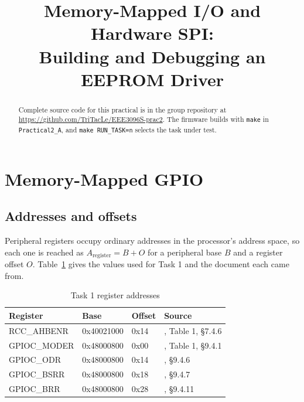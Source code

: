 \documentclass[conference]{IEEEtran}
\begin{document}
\title{Memory-Mapped I/O and Hardware SPI:\\Building and Debugging an EEPROM Driver}

\author{
\and
{}
}

\maketitle

\begin{abstract}
Complete source code for this practical is in the group repository at
\url{https://github.com/TriTacLe/EEE3096S-prac2}. The firmware builds with
\texttt{make} in \texttt{Practical2\_A}, and \texttt{make RUN\_TASK=n} selects
the task under test.
\end{abstract}

\section{Memory-Mapped GPIO}

\subsection{Addresses and offsets}

Peripheral registers occupy ordinary addresses in the processor's address
space, so each one is reached as $A_{\text{register}} = B + O$ for a peripheral
base $B$ and a register offset $O$. Table~\ref{tab:addresses} gives the values
used for Task 1 and the document each came from.

\begin{table}[htbp]
\caption{Task 1 register addresses}
\label{tab:addresses}
\centering
\begin{tabular}{llll}
\toprule
Register & Base & Offset & Source \\
\midrule
RCC\_AHBENR  & 0x40021000 & 0x14 & \cite{rm0091}, Table 1, \S7.4.6 \\
GPIOC\_MODER & 0x48000800 & 0x00 & \cite{rm0091}, Table 1, \S9.4.1 \\
GPIOC\_ODR   & 0x48000800 & 0x14 & \cite{rm0091}, \S9.4.6 \\
GPIOC\_BSRR  & 0x48000800 & 0x18 & \cite{rm0091}, \S9.4.7 \\
GPIOC\_BRR   & 0x48000800 & 0x28 & \cite{rm0091}, \S9.4.11 \\
\bottomrule
\end{tabular}
\end{table}
\end{document}
